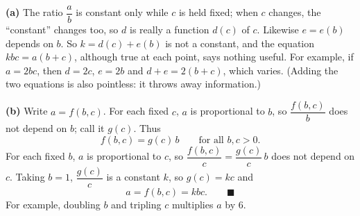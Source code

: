 \textbf{(a)} The ratio $\dfrac ab$ is constant only while $c$ is held fixed; when $c$ changes, the ``constant'' changes too, so $d$ is really a function $d(c)$ of $c$. Likewise $e=e(b)$ depends on $b$. So $k=d(c)+e(b)$ is not a constant, and the equation $kbc=a(b+c)$, although true at each point, says nothing useful. For example, if $a=2bc$, then $d=2c$, $e=2b$ and $d+e=2(b+c)$, which varies. (Adding the two equations is also pointless: it throws away information.)

\textbf{(b)} Write $a=f(b,c)$. For each fixed $c$, $a$ is proportional to $b$, so $\dfrac{f(b,c)}{b}$ does not depend on $b$; call it $g(c)$. Thus
\[f(b,c)=g(c)\,b\qquad\text{for all }b,c>0.\]
For each fixed $b$, $a$ is proportional to $c$, so $\dfrac{f(b,c)}{c}=\dfrac{g(c)}{c}\,b$ does not depend on $c$. Taking $b=1$, $\dfrac{g(c)}{c}$ is a constant $k$, so $g(c)=kc$ and
\[a=f(b,c)=kbc.\qquad\blacksquare\]
For example, doubling $b$ and tripling $c$ multiplies $a$ by $6$.
